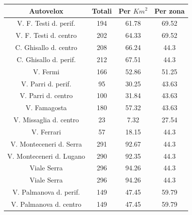 \documentclass[a4paper,12pt]{report}
\begin{document}
\begin{center}
    \def\arraystretch{1.5}%
    \begin{tabular}{ |c|c|c|c| }
        \hline
        Autovelox & Totali & Per $Km^2$ & Per zona \\ 
        \hline
        \rowcolor{TableGray}
        V. F. Testi d. perif.\footnotemark[1]   &   194 &   61.78   &   69.52 \\
        V. F. Testi d. centro                   &   202 &   64.33   &   69.52 \\
        \rowcolor{TableGray}
        C. Ghisallo d. centro\footnotemark[2]   &   208 &   66.24   &   44.3 \\
        C. Ghisallo d. perif.                   &   212 &   67.51   &   44.3 \\
        \rowcolor{TableGray}
        V. Fermi                                &   166 &   52.86   &   51.25 \\
        V. Parri d. perif.                      &    95 &   30.25   &   43.63 \\
        \rowcolor{TableGray}
        V. Parri d. centro                      &   100 &   31.84   &   43.63 \\
        V. Famagosta                            &   180 &   57.32   &   43.63 \\
        \rowcolor{TableGray}
        V. Missaglia d. centro                  &   23  &    7.32   &   27.54 \\
        V. Ferrari                              &   57  &   18.15   &   44.3 \\
        \rowcolor{TableGray}
        V. Monteceneri d. Serra                 &   291 &   92.67   &   44.3 \\
        V. Monteceneri d. Lugano                &   290 &   92.35   &   44.3 \\
        \rowcolor{TableGray}
        Viale Serra                             &   296 &   94.26   &   44.3 \\
        Viale Serra                             &   296 &   94.26   &   44.3 \\
        \rowcolor{TableGray}
        V. Palmanova d. perif.                  &   149 &   47.45   &   59.79 \\
        V. Palmanova d. centro                  &   149 &   47.45   &   59.79 \\
        \hline
    \end{tabular}
\end{center}
\end{document}
